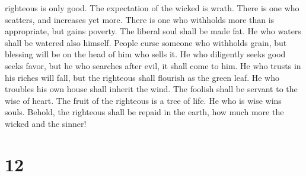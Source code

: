 righteous is only good. The expectation of the wicked is wrath.
 There is one who scatters, and increases yet more. There
is one who withholds more than is appropriate, but gains poverty.
 The liberal soul shall be made fat. He who waters shall be
watered also himself.  People curse someone who withholds
grain, but blessing will be on the head of him who sells it.
 He who diligently seeks good seeks favor, but he who
searches after evil, it shall come to him.  He who trusts
in his riches will fall, but the righteous shall flourish as the green
leaf.  He who troubles his own house shall inherit the
wind. The foolish shall be servant to the wise of heart. 
The fruit of the righteous is a tree of life. He who is wise wins souls.
 Behold, the righteous shall be repaid in the earth, how
much more the wicked and the sinner!

\hypertarget{section-11}{%
\section{12}\label{section-11}}

